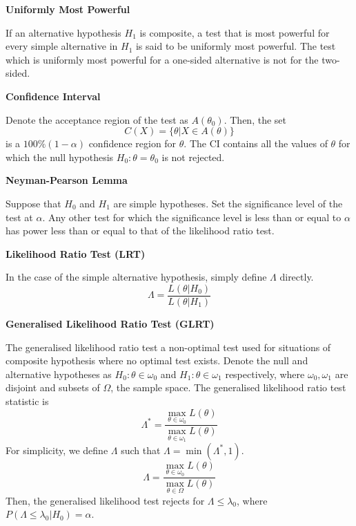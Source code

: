 \documentclass[a4paper]{article}
\newcommand{\subheading}[1]{{\scriptsize\textbf{#1}}}
\renewenvironment{section}[1]
  {
    \subheading{#1}\smallskip

  }{
    \medskip
  }
\begin{document}
\begin{multicols*}{4}
\begin{section}{Uniformly Most Powerful}
  If an alternative hypothesis $H_1$ is composite, a test that is most powerful
  for every simple alternative in $H_1$ is said to be uniformly most powerful.
  The test which is uniformly most powerful for a one-sided alternative is not
  for the two-sided.
\end{section}

\begin{section}{Confidence Interval}
  Denote the acceptance region of the test as $A(\theta_0)$. Then, the set
  $$C(X) = \{\theta | X \in A(\theta) \}$$
  is a $100\%(1-\alpha)$ confidence region for $\theta$. The CI contains all the
  values of $\theta$ for which the null hypothesis $H_0: \theta = \theta_0$ is
  not rejected.
\end{section}

\begin{section}{Neyman-Pearson Lemma}
  Suppose that $H_0$ and $H_1$ are simple hypotheses. Set the significance level
  of the test at $\alpha$. Any other test for which the significance level is
  less than or equal to $\alpha$ has power less than or equal to that of the
  likelihood ratio test.
\end{section}

\begin{section}{Likelihood Ratio Test (LRT)}
  In the case of the simple alternative hypothesis, simply define $\Lambda$
  directly.
  $$\Lambda = \frac{
    L(\theta | H_0)
  }{
    L(\theta | H_1)
  }$$
\end{section}

\begin{section}{Generalised Likelihood Ratio Test (GLRT)}
  The generalised likelihood ratio test a non-optimal test used for situations
  of composite hypothesis where no optimal test exists. Denote the null and
  alternative hypotheses as $H_0: \theta \in \omega_0$ and $H_1: \theta \in
  \omega_1$ respectively, where $\omega_0, \omega_1$ are disjoint and subsets of
  $\Omega$, the sample space. The generalised likelihood ratio test statistic is
  $$\Lambda^* = \frac{
    \max_{\theta \in \omega_0} L(\theta)
  }{
    \max_{\theta \in \omega_1} L(\theta)
  }$$
  For simplicity, we define $\Lambda$ such that $\Lambda = \min(\Lambda^*, 1)$.
  $$\Lambda = \frac{
    \max_{\theta \in \omega_0} L(\theta)
  }{
    \max_{\theta \in \Omega} L(\theta)
  }$$
  Then, the generalised likelihood test rejects for $\Lambda \leq \lambda_0$,
  where $P(\Lambda \leq \lambda_0 | H_0) = \alpha$.
\end{section}


\end{multicols*}
\end{document}
